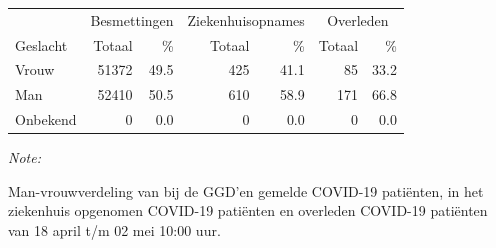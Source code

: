 \documentclass[
  english,
  man,floatsintext]{apa6}
\begin{document}
\begin{table}
\centering\begingroup\fontsize{11}{13}\selectfont

\begin{threeparttable}
\begin{tabular}{lrrrrrr}
\toprule
\multicolumn{1}{c}{ } & \multicolumn{2}{c}{Besmettingen} & \multicolumn{2}{c}{Ziekenhuisopnames} & \multicolumn{2}{c}{Overleden} \\
\cmidrule(l{3pt}r{3pt}){2-3} \cmidrule(l{3pt}r{3pt}){4-5} \cmidrule(l{3pt}r{3pt}){6-7}
Geslacht & Totaal & \% & Totaal & \% & Totaal & \%\\
\midrule
Vrouw & 51372 & 49.5 & 425 & 41.1 & 85 & 33.2\\
Man & 52410 & 50.5 & 610 & 58.9 & 171 & 66.8\\
Onbekend & 0 & 0.0 & 0 & 0.0 & 0 & 0.0\\
\bottomrule
\end{tabular}
\begin{tablenotes}
\item \textit{Note: } 
\item Man-vrouwverdeling van bij de GGD’en gemelde COVID-19 patiënten, in het ziekenhuis opgenomen COVID-19 patiënten en overleden COVID-19 patiënten van 18 april t/m 02 mei 10:00 uur.
\end{tablenotes}
\end{threeparttable}
\endgroup{}
\end{table}
\newpage
\end{document}
